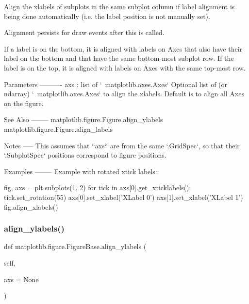 \begin{DoxyVerb}Align the xlabels of subplots in the same subplot column if label
alignment is being done automatically (i.e. the label position is
not manually set).

Alignment persists for draw events after this is called.

If a label is on the bottom, it is aligned with labels on Axes that
also have their label on the bottom and that have the same
bottom-most subplot row.  If the label is on the top,
it is aligned with labels on Axes with the same top-most row.

Parameters
----------
axs : list of `~matplotlib.axes.Axes`
    Optional list of (or ndarray) `~matplotlib.axes.Axes`
    to align the xlabels.
    Default is to align all Axes on the figure.

See Also
--------
matplotlib.figure.Figure.align_ylabels
matplotlib.figure.Figure.align_labels

Notes
-----
This assumes that ``axs`` are from the same `.GridSpec`, so that
their `.SubplotSpec` positions correspond to figure positions.

Examples
--------
Example with rotated xtick labels::

    fig, axs = plt.subplots(1, 2)
    for tick in axs[0].get_xticklabels():
tick.set_rotation(55)
    axs[0].set_xlabel('XLabel 0')
    axs[1].set_xlabel('XLabel 1')
    fig.align_xlabels()
\end{DoxyVerb}
 \mbox{\label{classmatplotlib_1_1figure_1_1FigureBase_a3a2ec771d76a0e7b5e2806139a0c7ec8}} 
\subsubsection{\texorpdfstring{align\+\_\+ylabels()}{align\_ylabels()}}
{\footnotesize\ttfamily def matplotlib.\+figure.\+Figure\+Base.\+align\+\_\+ylabels (\begin{DoxyParamCaption}\item[{}]{self,  }\item[{}]{axs = {\ttfamily None} }\end{DoxyParamCaption})}

